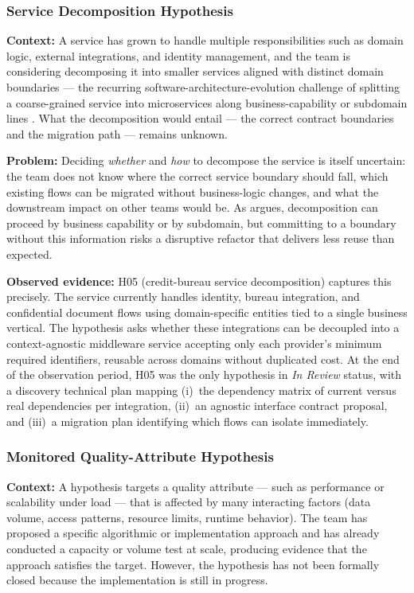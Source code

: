 \subsubsection{Service Decomposition Hypothesis}
\label{subsubsec:pattern-b3}
\textbf{Context:} A service has grown to handle multiple responsibilities such as domain
logic, external integrations, and identity management, and the team is
considering decomposing it into smaller services aligned with distinct domain
boundaries --- the recurring software-architecture-evolution challenge of
splitting a coarse-grained service into microservices along business-capability
or subdomain lines \citep{richardson2018microservices}. What the decomposition
would entail --- the correct contract boundaries and the migration path ---
remains unknown.

\textbf{Problem:} Deciding \textit{whether} and \textit{how} to decompose the service
is itself uncertain: the team does not know where the correct service boundary
should fall, which existing flows can be migrated without business-logic
changes, and what the downstream impact on other teams would be. As
\citet{richardson2018microservices} argues, decomposition can proceed by
business capability or by subdomain, but committing to a boundary without this
information risks a disruptive refactor that delivers less reuse than expected.

\textbf{Observed evidence:} H05 (credit-bureau service decomposition) captures this
precisely. The service currently handles identity, bureau integration, and
confidential document flows using domain-specific entities tied to a single
business vertical. The hypothesis asks whether these integrations can be
decoupled into a context-agnostic middleware service accepting only each provider's minimum
required identifiers, reusable across domains without duplicated cost. At the
end of the observation period, H05 was the only hypothesis in \textit{In Review}
status, with a discovery technical plan mapping (i)~the dependency matrix of
current versus real dependencies per integration, (ii)~an agnostic interface
contract proposal, and (iii)~a migration plan identifying which flows can isolate
immediately.

\subsubsection{Monitored Quality-Attribute Hypothesis}
\label{subsubsec:pattern-b4}
\textbf{Context:} A hypothesis targets a quality attribute --- such as
performance or scalability under load --- that is affected by many interacting
factors (data volume, access patterns, resource limits, runtime behavior). The
team has proposed a specific algorithmic or implementation approach and has
already conducted a capacity or volume test at scale, producing evidence that
the approach satisfies the target. However, the hypothesis has not been formally
closed because the implementation is still in progress.

